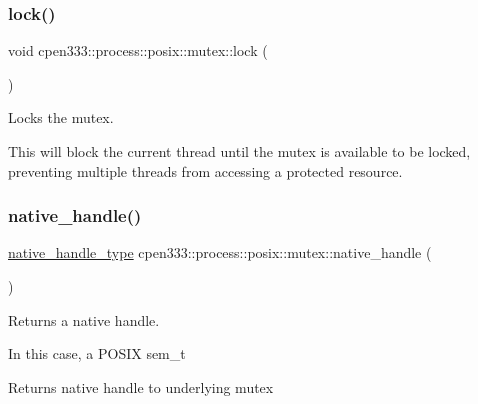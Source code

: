 \subsubsection{\texorpdfstring{lock()}{lock()}}
{\footnotesize\ttfamily void cpen333\+::process\+::posix\+::mutex\+::lock (\begin{DoxyParamCaption}{ }\end{DoxyParamCaption})\hspace{0.3cm}{\ttfamily [inline]}}



Locks the mutex. 

This will block the current thread until the mutex is available to be locked, preventing multiple threads from accessing a protected resource. \mbox{\label{classcpen333_1_1process_1_1posix_1_1mutex_aa36462cbd2181e20caa35656c619c6dd}} 
\subsubsection{\texorpdfstring{native\+\_\+handle()}{native\_handle()}}
{\footnotesize\ttfamily \hyperlink{classcpen333_1_1process_1_1posix_1_1mutex_aac6d3675fcffc52ddf281e952968e44b}{native\+\_\+handle\+\_\+type} cpen333\+::process\+::posix\+::mutex\+::native\+\_\+handle (\begin{DoxyParamCaption}{ }\end{DoxyParamCaption})\hspace{0.3cm}{\ttfamily [inline]}}



Returns a native handle. 

In this case, a P\+O\+S\+IX sem\+\_\+t

\begin{DoxyReturn}{Returns}
native handle to underlying mutex 
\end{DoxyReturn}
\mbox{\label{classcpen333_1_1process_1_1posix_1_1mutex_ae19f7c8370308f7333cee340fef91049}} 
